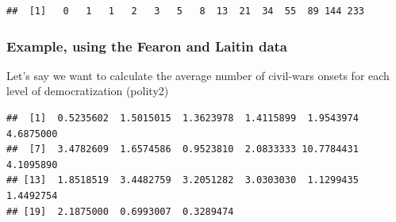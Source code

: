 \documentclass[]{article}
\newenvironment{Shaded}{\begin{snugshade}}{\end{snugshade}}
\newcommand{\KeywordTok}[1]{\textcolor[rgb]{0.13,0.29,0.53}{\textbf{#1}}}
\newcommand{\DataTypeTok}[1]{\textcolor[rgb]{0.13,0.29,0.53}{#1}}
\newcommand{\DecValTok}[1]{\textcolor[rgb]{0.00,0.00,0.81}{#1}}
\newcommand{\StringTok}[1]{\textcolor[rgb]{0.31,0.60,0.02}{#1}}
\newcommand{\CommentTok}[1]{\textcolor[rgb]{0.56,0.35,0.01}{\textit{#1}}}
\newcommand{\OtherTok}[1]{\textcolor[rgb]{0.56,0.35,0.01}{#1}}
\newcommand{\ControlFlowTok}[1]{\textcolor[rgb]{0.13,0.29,0.53}{\textbf{#1}}}
\newcommand{\OperatorTok}[1]{\textcolor[rgb]{0.81,0.36,0.00}{\textbf{#1}}}
\newcommand{\RegionMarkerTok}[1]{#1}
\newcommand{\NormalTok}[1]{#1}
\begin{document}
\begin{verbatim}
##  [1]   0   1   1   2   3   5   8  13  21  34  55  89 144 233
\end{verbatim}

\subsubsection{Example, using the Fearon and Laitin
data}\label{example-using-the-fearon-and-laitin-data}

Let's say we want to calculate the average number of civil-wars onsets
for each level of democratization (polity2)

\begin{Shaded}
\end{Shaded}

\begin{verbatim}
##  [1]  0.5235602  1.5015015  1.3623978  1.4115899  1.9543974  4.6875000
##  [7]  3.4782609  1.6574586  0.9523810  2.0833333 10.7784431  4.1095890
## [13]  1.8518519  3.4482759  3.2051282  3.0303030  1.1299435  1.4492754
## [19]  2.1875000  0.6993007  0.3289474
\end{verbatim}
\end{document}
